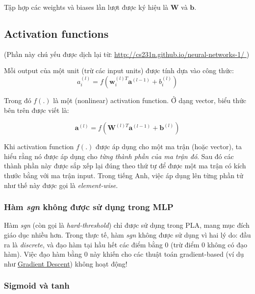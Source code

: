 Tập hợp các weights và biases lần lượt được ký hiệu là $\mathbf{W}$ và $\mathbf{b}$. 
 
 
\subsection{Activation functions}
(Phần này chú yếu được dịch lại từ: \href{http://machinelearningcoban.comCS231n Convolutional Neural Networks for Visual Recognition}{http://cs231n.github.io/neural-networks-1/ }) 
 
Mỗi output của một unit (trừ các input units) được tính dựa vào công thức: 
\begin{equation*} 
a_i^{(l)} = f(\mathbf{w}_i^{(l)T}\mathbf{a}^{(l-1)} + b_i^{(l)}) 
\end{equation*} 
 
Trong đó $f(.)$ là một (nonlinear) activation function. Ở dạng vector, biểu thức bên trên được viết là: 
 
\begin{equation*} 
\mathbf{a}^{(l)} = f(\mathbf{W}^{(l)T}\mathbf{a}^{(l-1)} + \mathbf{b}^{(l)}) 
\end{equation*} 
 
Khi activation function $f(.)$ được áp dụng cho một ma trận (hoặc vector), ta hiểu rằng nó được áp dụng cho \textit{từng thành phần của ma trận đó}. Sau đó các thành phần này được sắp xếp lại đúng theo thứ tự để được một ma trận có kích thước bằng với ma trận input. Trong tiếng Anh, việc áp dụng lên từng phần tử như thế này được gọi là \textit{element-wise}. 
 
 
\subsubsection{Hàm \textit{sgn} không được sử dụng trong MLP}
Hàm \textit{sgn} (còn gọi là \textit{hard-threshold}) chỉ được sử dụng trong PLA, mang mục đích giáo dục nhiều hơn. Trong thực tế, 
hàm \textit{sgn} không được sử dụng vì hai lý do: đầu ra là \textit{discrete}, và đạo hàm tại hầu hết các điểm bằng 0 (trừ điểm 0 không có đạo hàm). 
Việc đạo hàm bằng 0 này khiến cho các thuật toán gradient-based (ví dụ như \href{http://machinelearningcoban.com/2017/01/12/gradientdescent/}{Gradient Descent}) không hoạt động! 
 
 
\subsubsection{Sigmoid và tanh}
 
